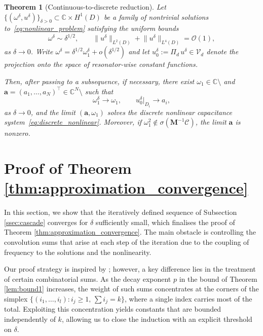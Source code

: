 \documentclass[a4paper,reqno,twoside]{amsart}
\numberwithin{equation}{section}
\newtheorem{theorem}{Theorem}[section]
\theoremstyle{definition}
\newcommand{\<}{\ensuremath \leq}
\renewcommand{\>}{\ensuremath \geq}
\begin{document}
\begin{theorem}[Continuous-to-discrete reduction]\label{thm:converse}
    Let $\{(\omega^\delta, u^\delta)\}_{\delta > 0} \subset \mathbb{C} \times H^1(D)$
    be a family of nontrivial solutions to~\eqref{eq:nonlinear_problem}
    satisfying the uniform bounds
    \begin{equation}\label{eq:uniform_bounds}
        \omega^\delta \sim \delta^{1/2},
        \qquad
        \lVert u^\delta \rVert_{L^2(D)}+ \lVert u^\delta \rVert_{L^4(D)} = \mathcal{O}(1),
    \end{equation}
    as $\delta \to 0$. Write $\omega^\delta = \delta^{1/2}\omega_1^\delta + o(\delta^{1/2})$
    and let $u_0^\delta := \Pi_d \, u^\delta \in \mathcal{V}_d$ denote the
    projection onto the space of resonator-wise constant functions.

    Then, after passing to a subsequence, if necessary, there exist
    $\omega_1 \in \mathbb{C} \setminus$ and
    $\mathbf{a} = (a_1, \dots, a_N)^\top \in \mathbb{C}^N \setminus$
    such that
    \begin{equation}
        \omega_1^\delta \to \omega_1,
        \qquad
        u_0^\delta|_{D_i} \to a_i,
    \end{equation}
    as $\delta \to 0$, and the limit $(\mathbf{a}, \omega_1)$ solves the
    discrete nonlinear capacitance
    system~\eqref{eq:discrete_nonlinear}. Moreover, if $\omega_1^2\notin\sigma(\mathbf{M}^{-1}\mathcal{C})$, the limit $\mathbf{a}$ is nonzero.
\end{theorem}
\section{Proof of Theorem \ref{thm:approximation_convergence}}\label{sec:proof1}
In this section, we show that the iteratively defined sequence of Subsection \ref{ssec:cascade} converges for $\delta$ sufficiently small, which finalises the proof of Theorem \ref{thm:approximation_convergence}. The main obstacle is controlling the convolution sums that arise at each step of the iteration due to the coupling of frequency to the solutions and the nonlinearity.


Our proof strategy is inspired by \cite{sacchetti2023perturbation}; however, a key difference lies in the treatment of certain combinatorial sums. As the decay exponent
$p$ in the bound of Theorem \ref{lem:bound1} increases, the weight of such sums concentrates at the corners of the simplex $\{(i_1, \dots, i_l) : i_j \geq 1, \, \sum i_j = k\}$, where a single index carries most of the total. Exploiting this concentration yields constants that are bounded independently of
$k$, allowing us to close the induction with an explicit threshold on $\delta$.
\end{document}
